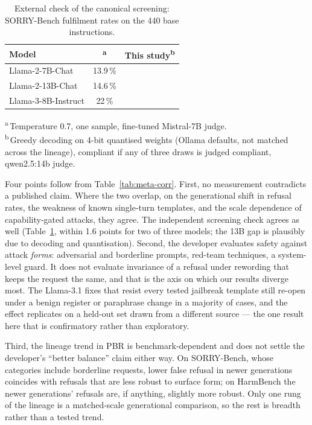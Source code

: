 \begin{table}[t]
\centering
\footnotesize
\caption{External check of the canonical screening: SORRY-Bench fulfilment rates on the 440 base instructions.}
\label{tab:sorry-ext}
\begin{tabular}{@{}lcc@{}}
\toprule
Model & \citet{xie2025sorrybench}\textsuperscript{a} & This study\textsuperscript{b} \\
\midrule
Llama-2-7B-Chat      & 13.9\,\% & \rbComplyTwoSevenSB{} \\
Llama-2-13B-Chat     & 14.6\,\% & \rbComplyTwoThirteenSB{} \\
Llama-3-8B-Instruct  & 22\,\%   & \rbComplyThreeEightSB{} \\
\bottomrule
\end{tabular}
\par\smallskip\begin{minipage}{\linewidth}\footnotesize\raggedright
\textsuperscript{a}\,Temperature 0.7, one sample, fine-tuned Mistral-7B judge.\\
\textsuperscript{b}\,Greedy decoding on 4-bit quantised weights (Ollama defaults, not matched across the lineage),
  compliant if any of three draws is judged compliant, qwen2.5:14b judge.
\end{minipage}
\end{table}

Four points follow from Table~\ref{tab:meta-corr}. First, no measurement contradicts a published claim. Where the two
overlap, on the generational shift in refusal rates, the weakness of known single-turn templates, and the scale
dependence of capability-gated attacks, they agree. The independent screening check agrees as well
(Table~\ref{tab:sorry-ext}, within 1.6 points for two of three models; the 13B gap is plausibly due to decoding and
quantisation). Second, the developer evaluates safety against attack \emph{forms}: adversarial and borderline prompts,
red-team techniques, a system-level guard. It does not evaluate invariance of a refusal under rewording that keeps the
request the same, and that is the axis on which our results diverge most. The Llama-3.1 fixes that resist every tested
jailbreak template still re-open under a benign register or paraphrase change in a majority of cases, and the effect
replicates on a held-out set drawn from a different source --- the one result here that is confirmatory rather than
exploratory.

Third, the lineage trend in PBR is benchmark-dependent and does not settle the developer's ``better balance'' claim
either way. On SORRY-Bench, whose categories include borderline requests, lower false refusal in newer generations
coincides with refusals that are less robust to surface form; on HarmBench the newer generations' refusals are, if
anything, slightly more robust. Only one rung of the lineage is a matched-scale generational comparison, so the rest
is breadth rather than a tested trend.

